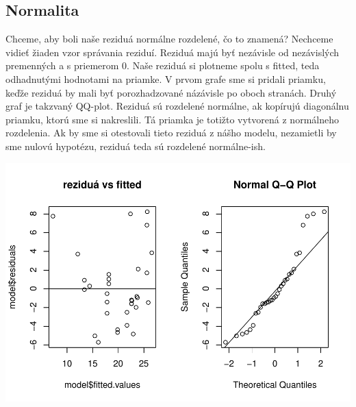 \documentclass[]{article}
\newenvironment{Shaded}{\begin{snugshade}}{\end{snugshade}}
\newcommand{\CommentTok}[1]{\textcolor[rgb]{0.56,0.35,0.01}{\textit{#1}}}
\newcommand{\DataTypeTok}[1]{\textcolor[rgb]{0.13,0.29,0.53}{#1}}
\newcommand{\DecValTok}[1]{\textcolor[rgb]{0.00,0.00,0.81}{#1}}
\newcommand{\KeywordTok}[1]{\textcolor[rgb]{0.13,0.29,0.53}{\textbf{#1}}}
\newcommand{\NormalTok}[1]{#1}
\newcommand{\OperatorTok}[1]{\textcolor[rgb]{0.81,0.36,0.00}{\textbf{#1}}}
\newcommand{\StringTok}[1]{\textcolor[rgb]{0.31,0.60,0.02}{#1}}
\begin{document}
\hypertarget{normalita}{%
\subsection{Normalita}\label{normalita}}

Chceme, aby boli naše reziduá normálne rozdelené, čo to znamená?
Nechceme vidieť žiaden vzor správania reziduí. Reziduá majú byť
nezávisle od nezávislých premenných a s priemerom 0. Naše reziduá si
plotneme spolu s fitted, teda odhadnutými hodnotami na priamke. V prvom
grafe sme si pridali priamku, keďže reziduá by mali byť porozhadzované
názávisle po oboch stranách. Druhý graf je takzvaný QQ-plot. Reziduá sú
rozdelené normálne, ak kopírujú diagonálnu priamku, ktorú sme si
nakreslili. Tá priamka je totižto vytvorená z normálneho rozdelenia. Ak
by sme si otestovali tieto reziduá z nášho modelu, nezamietli by sme
nulovú hypotézu, reziduá teda sú rozdelené normálne-ish.

\begin{Shaded}
\end{Shaded}

\includegraphics{test_files/figure-latex/unnamed-chunk-50-1.pdf}
\end{document}
